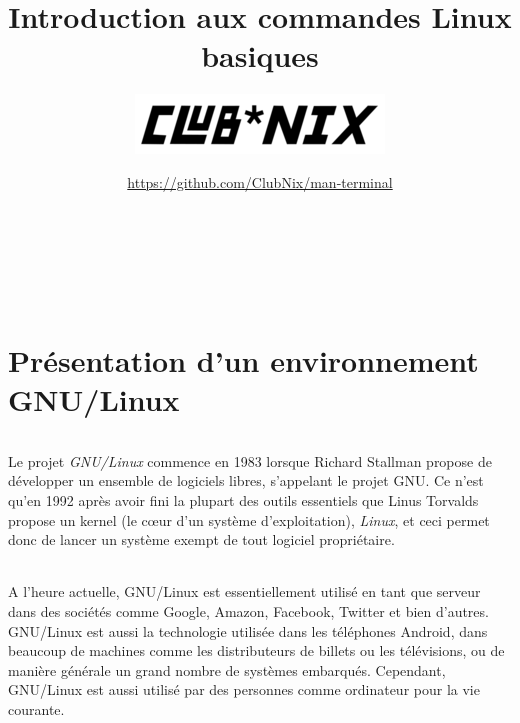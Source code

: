 \documentclass[french, a4paper, 12pt, titlepage]{article}
\begin{document}
\title{Introduction aux commandes Linux basiques}
\author{\includegraphics[scale=0.7]{clubnix}}
\date{\url{https://github.com/ClubNix/man-terminal}}

\maketitle

\vfill
\pagebreak
\newpage
\thispagestyle{empty}
~


\strut\thispagestyle{empty}
\vfill
\pagebreak
\tableofcontents
\strut\thispagestyle{empty}

\vfill
\pagebreak
\newpage
\thispagestyle{empty}
~
\pagebreak

\setcounter{page}{1}

\part{Présentation d'un environnement GNU/Linux}

\paragraph{}
Le projet \textit{GNU/Linux} commence en 1983 lorsque Richard Stallman propose
de développer un ensemble de logiciels libres, s'appelant le projet GNU. Ce
n'est qu'en 1992 après avoir fini la plupart des outils essentiels que Linus
Torvalds propose un kernel (le cœur d'un système d'exploitation),
\textit{Linux}, et ceci permet donc de lancer un système exempt de tout
logiciel propriétaire.

\paragraph{}
A l'heure actuelle, GNU/Linux est essentiellement utilisé en tant que serveur
dans des sociétés comme Google, Amazon, Facebook, Twitter et bien d'autres.
GNU/Linux est aussi la technologie utilisée dans les téléphones Android, dans
beaucoup de machines comme les distributeurs de billets ou les télévisions, ou
de manière générale un grand nombre de systèmes embarqués. Cependant, GNU/Linux
est aussi utilisé par des personnes comme ordinateur pour la vie courante.
\end{document}
